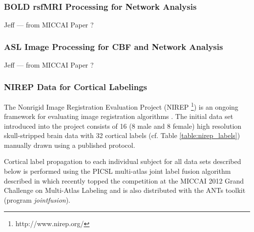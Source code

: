 \subsubsection{BOLD rsfMRI Processing for Network Analysis}

Jeff --- from MICCAI Paper ?

\subsubsection{ASL Image Processing for CBF and Network Analysis}

Jeff --- from MICCAI Paper ?

\subsubsection{NIREP Data for Cortical Labelings}

The Nonrigid Image Registration Evaluation Project (NIREP%
\footnote{
http://www.nirep.org/
}) 
is an ongoing framework for evaluating image registration algorithms \citep{christensen2006}.
The initial data set introduced into the project consists of 
16 (8 male and 8 female) high resolution skull-stripped brain 
data with 32 cortical labels (cf. Table \ref{table:nirep_labels}) manually drawn using a 
published protocol.

Cortical label propagation to each individual subject for all data sets
described below is performed using the PICSL multi-atlas joint label fusion
algorithm described in \cite{wang2013} which recently topped the competition
at the MICCAI 2012 Grand Challenge on Multi-Atlas Labeling and is also 
distributed with the ANTs toolkit (program {\em jointfusion}).


